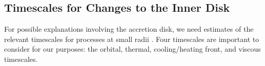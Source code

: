 \documentclass[iop]{emulateapj}
\def\eg{{e.g.}}
\begin{document}

\subsection{Timescales for Changes to the Inner Disk}
\label{sec:times}

For possible explanations involving the accretion disk, we need
estimates of the relevant timescales for processes at small radii
\citep[\eg,][]{Czerny:06}.  Four timescales are important to consider
for our purposes:  the orbital, thermal, cooling/heating front, and
viscous timescales.
\end{document}

